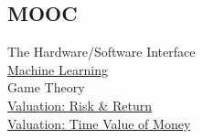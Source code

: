 \documentclass[]{deedy}
\begin{document}
\begin{minipage}[t]{0.27\textwidth}
\begin{flushleft}
\subsection{MOOC}
The Hardware/Software Interface \\
\vspace{1.5pt}
\href{https://www.coursera.org/account/accomplishments/certificate/7V2KZSKAL7ZJ}{Machine Learning} \\
\vspace{1.5pt}
Game Theory \\
\vspace{1.5pt}
\href{https://www.coursera.org/account/accomplishments/certificate/98ZD8GFQ8BMS}{Valuation: Risk \& Return} \\
\vspace{1.5pt}
\href{https://www.coursera.org/account/accomplishments/certificate/P637RR9C8B7T}{Valuation: Time Value of Money}
\sectionsep
%
\end{flushleft}
\end{minipage}
\hfill
%
\end{document}
